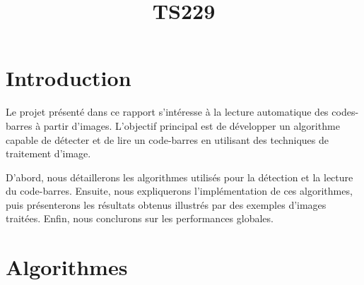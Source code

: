 \documentclass{rapport}
\title{TS229}
\begin{document}

\fairemarges %
\fairepagedegarde %
\newpage
\tabledematieres %
\newpage

\section{Introduction}
Le projet présenté dans ce rapport s'intéresse à la lecture automatique des codes-barres à partir d'images. 
L'objectif principal est de développer un algorithme capable de détecter et de lire un code-barres en utilisant des techniques de traitement d'image.

D'abord, nous détaillerons les algorithmes utilisés pour la détection et la lecture du code-barres. 
Ensuite, nous expliquerons l'implémentation de ces algorithmes, puis présenterons les résultats obtenus illustrés par des exemples d'images traitées. 
Enfin, nous conclurons sur les performances globales.

\section{Algorithmes}

\end{document}
